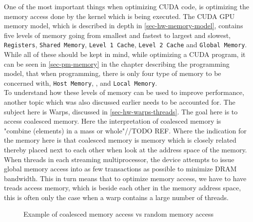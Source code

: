 One of the most important things when optimizing CUDA code, is optimizing the memory access done by the kernel which is being executed. The CUDA GPU memory model, which is described in depth in \cref{sec-hw-memory-model}, contains five levels of memory going from smallest and fastest to largest and slowest, \texttt{Registers}, \texttt{Shared Memory}, \texttt{Level 1 Cache}, \texttt{Level 2 Cache} and \texttt{Global Memory}. While all of these should be kept in mind, while optimizing a CUDA program, it can be seen in \cref{sec-pm-memory} in the chapter describing the programming model, that when programming, there is only four type of memory to be concerned with, \texttt{Host Memory}, ,  and \texttt{Local Memory}.\\
To understand how these levels of memory can be used to improve performance, another topic which was also discussed earlier needs to be accounted for. The subject here is Warps, discussed in \cref{sec-hw-warps-threads}. The goal here is to access coalesced memory. Here the interpretation of coalesced memory is "combine (elements) in a mass or whole"//TODO REF. Where the indication for the memory here is that coalesced memory is memory which is closely related thereby placed next to each other when look at the address space of the memory. When threads in each streaming multiprocessor, the device attempts to issue global memory access into as few transactions as possible to minimize DRAM bandwidth. This in turn means that to optimize memory access, we have to have treads access memory, which is beside each other in the memory address space, this is often only the case when a warp contains a large number of threads.\\

\begin{figure}[ht]
	\centering
	\caption{Example of coalesced memory access vs random memory access}
	\label{fig:coalesced_memory}
\end{figure}

